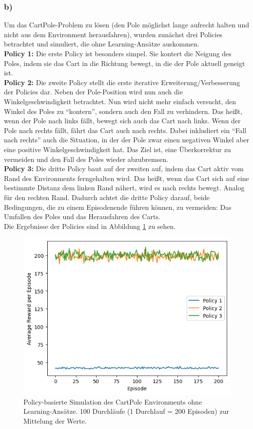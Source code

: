 \documentclass[11pt]{article}
\begin{document}
\subsubsection*{b)}

Um das CartPole-Problem zu lösen (den Pole möglichst lange aufrecht halten und nicht aus dem Environment herausfahren), wurden zunächst drei Policies betrachtet und simuliert, die ohne Learning-Ansätze auskommen.\\
\textbf{Policy 1:} Die erste Policy ist besonders simpel. Sie kontert die Neigung des Poles, indem sie das Cart in die Richtung bewegt, in die der Pole aktuell geneigt ist.\\
\textbf{Policy 2:} Die zweite Policy stellt die erste iterative Erweiterung/Verbesserung der Policies dar. Neben der Pole-Position wird nun auch die Winkelgeschwindigkeit betrachtet. Nun wird nicht mehr einfach versucht, den Winkel des Poles zu ``kontern'', sondern auch den Fall zu verhindern. Das heißt, wenn der Pole nach  links fällt, bewegt sich auch das Cart nach links. Wenn der Pole nach rechts fällt, fährt das Cart auch nach rechts. Dabei inkludiert ein ``Fall nach rechts'' auch die Situation, in der der Pole zwar einen negativen Winkel aber eine positive Winkelgeschwindigkeit hat. Das Ziel ist, eine Überkorrektur zu vermeiden und den Fall des Poles wieder abzubremsen.\\
\textbf{Policy 3:} Die dritte Policy baut auf der zweiten auf, indem das Cart aktiv vom Rand des Environments ferngehalten wird. Das heißt, wenn das Cart sich auf eine bestimmte Distanz dem linken Rand nähert, wird es nach rechts bewegt. Analog für den rechten Rand. Dadurch achtet die dritte Policy darauf, beide Bedingungen, die zu einem Episodenende führen können, zu vermeiden: Das Umfallen des Poles und das Herausfahren des Carts.\\
Die Ergebnisse der Policies sind in Abbildung \ref{img:2_3_b} zu sehen.

\begin{figure}
    \centering
    \includegraphics[width=\textwidth]{img/img_2_3_b.png}
    \caption{Policy-basierte Simulation des CartPole Environments ohne Learning-Ansätze. 100 Durchläufe (1 Durchlauf = 200 Episoden) zur Mittelung der Werte.}
    \label{img:2_3_b}
\end{figure}
\end{document}
